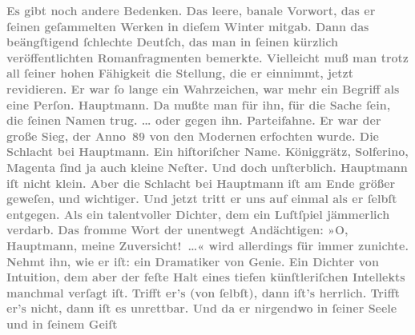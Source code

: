 \begin{ledgroupsized}[t]{13cm}
           \pstart
           \noindent{}\textcolor{gray}{\textbf{Es gibt noch andere Bedenken. Das leere, banale Vorwort, das er
                  ſeinen geſammelten Werken in dieſem Winter mitgab. Dann das beängſtigend ſchlechte
                  Deutſch, das man in ſeinen kürzlich veröffentlichten Romanfragmenten bemerkte.
                  Vielleicht muß man trotz all ſeiner hohen Fähigkeit die Stellung, die er einnimmt,
                  jetzt revidieren. Er war ſo lange ein Wahrzeichen, war mehr ein Begriff als eine
                  Perſon. Hauptmann. Da mußte man für ihn,
                  für die Sache ſein, die ſeinen Namen trug. \textsc{\label{K_L03438-881v}\label{K_L03438-881h}}{\dots} oder gegen ihn. Parteifahne. Er war der große Sieg,
                  der Anno 89 von den Modernen erfochten wurde. Die Schlacht bei Hauptmann. Ein hiſtoriſcher Name. Königgrätz, Solferino, Magenta ſind ja auch
                  kleine Neſter. Und doch unſterblich. Hauptmann iſt nicht klein. Aber die Schlacht bei Hauptmann iſt am Ende größer geweſen, und wichtiger. Und
                  jetzt tritt er uns auf einmal als er ſelbſt entgegen. Als ein talentvoller
                  Dichter, dem ein Luſtſpiel jämmerlich verdarb. Das fromme Wort der unentwegt
                  Andächtigen: »O, Hauptmann, meine
                     Zuversicht! {\dots}« wird allerdings für immer
                  zunichte. Nehmt ihn, wie er iſt: ein Dramatiker von Genie. Ein Dichter von
                  Intuition, dem aber der feſte Halt eines tiefen künſtleriſchen Intellekts manchmal
                  verſagt iſt. Trifft er’s (von ſelbſt), dann iſt’s herrlich. Trifft er’s nicht,
                  dann iſt es unrettbar. Und da er nirgendwo in ſeiner Seele und in ſeinem Geiſt
}}
\end{ledgroupsized}
